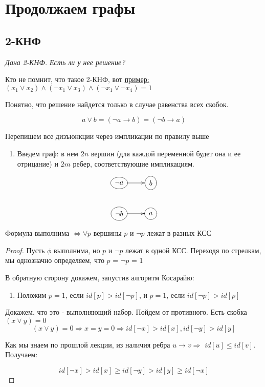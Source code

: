 
\section{Продолжаем графы}

\subsection{2-КНФ}

\textit{Дана 2-КНФ. Есть ли у нее решение?}

\text{}

Кто не помнит, что такое 2-КНФ, вот \underline{пример:} $(x_1 \vee x_2) \wedge (\neg x_1 \vee x_3)\wedge (\neg x_1 \vee \neg x_4) = 1$


Понятно, что решение найдется только в случае равенства всех скобок.

$$a \vee b = (\neg a \to b) = (\neg b \to a)$$

Перепишем все дизъюнкции через импликации по правилу выше 

\begin{enumerate}
  \item Введем граф: в нем $2n$ вершин (для каждой переменной будет она и ее отрицание) и $2m$ ребер, соответствующие импликациям. 
  
\end{enumerate}

$$\xymatrix{
  *+[o]+[F]{\neg a} \ar[r] & *+[o]+[F]{b}\\
  *+[o]+[F]{\neg b} \ar[r] & *+[o]+[F]{a}
}$$

\begin{proposition}
  Формула выполнима $\Longleftrightarrow \forall p$ вершины $p$ и $\neg p$ лежат в разных КСС
\end{proposition}

\begin{proof}
  Пусть $\phi$ выполнима, но $p$ и $\neg p$ лежат в одной КСС. Переходя по стрелкам, мы однозначно определяем, что $p$ = $\neg p$ = 1

  В обратную сторону докажем, запустив алгоритм Косарайю: 

  \begin{enumerate}
    \item Положим $p = 1$, если $id[p] > id[\neg p]$, и $p = 1$, если $id[\neg p] > id[p]$
  \end{enumerate}

  Докажем, что это - выполняющий набор. Пойдем от противного. Есть скобка $(x \vee y) = 0 $
  $$(x \vee y) = 0\Rightarrow x = y = 0 \Rightarrow id[\neg x] > id[x], id[\neg y] > id[y]$$

  Как мы знаем по прошлой лекции, из наличия ребра $u \to v \Rightarrow$ $id[u] \le id[v]$. Получаем:

  $$id[\neg x] > id[x] \ge id[\neg y] > id[y] \ge id[\neg x] $$
\end{proof}


